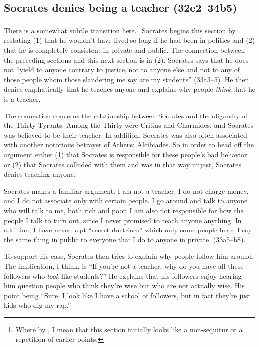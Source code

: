 \documentclass[11pt]{article}
\begin{document}

\subsection{Socrates denies being a teacher (32e2--34b5)}

There is a somewhat subtle transition here.\footnote{Where by , I mean that this section initially looks like a non-sequitur or a repetition of earlier points.}  Socrates begins this section by restating (1) that he wouldn't have lived so long if he had been in politics and (2) that he is completely consistent in private and public.  The connection between the preceding sections and this next section is in (2).  Socrates says that he does not ``yield to anyone contrary to justice, not to anyone else and not to any of those people whom those slandering me say are my students'' (33a3--5).  He then denies emphatically that he teaches anyone and explains why people \emph{think} that he is a teacher.

The connection concerns the relationship between Socrates and the oligarchy of the Thirty Tyrants.  Among the Thirty were Critias and Charmides, and Socrates was believed to be their teacher.  In addition, Socrates was also often associated with another notorious betrayer of Athens: Alcibiades.  So in order to head off the argument either (1) that Socrates is responsible for these people's bad behavior or (2) that Socrates colluded with them and was in that way unjust, Socrates denies teaching anyone.

Socrates makes a familiar argument.  I am not a teacher.  I do not charge money, and I do not associate only with certain people.  I go around and talk to anyone who will talk to me, both rich and poor.  I am also not responsible for how the people I talk to turn out, since I never promised to teach anyone anything.  In addition, I have never kept ``secret doctrines'' which only some people hear.  I say the same thing in public to everyone that I do to anyone in private. (33a5--b8).

To support his case, Socrates then tries to explain why people follow him around.  The implication, I think, is ``If you're not a teacher, why do you have all these followers who \emph{look} like students?''  He explains that his followers enjoy hearing him question people who think they're wise but who are not actually wise.  His point being ``Sure, I look like I have a school of followers, but in fact they're just kids who dig my rap.''
\end{document}
